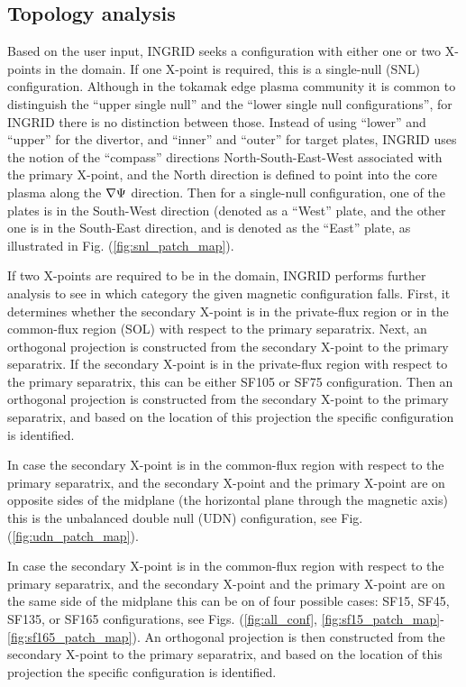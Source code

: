\subsection{Topology analysis}

Based on the user input, INGRID seeks a configuration with either one
or two X-points in the domain. If one X-point is required, this is a
single-null (SNL) configuration. Although in the tokamak edge plasma
community it is common to distinguish the ``upper single null'' and
the ``lower single null configurations'', for INGRID there is no
distinction between those. Instead of using ``lower'' and ``upper''
for the divertor, and ``inner'' and ``outer'' for target plates,
INGRID uses the notion of the ``compass'' directions
North-South-East-West associated with the primary X-point, and the
North direction is defined to point into the core plasma along the
$\nabla \Psi$ direction. Then for a single-null configuration, one of
the plates is in the South-West direction (denoted as a ``West''
plate, and the other one is in the South-East direction, and is
denoted as the ``East'' plate, as illustrated in Fig. (\ref{fig:snl_patch_map}).

If two X-points are required to be in the domain, INGRID performs
further analysis to see in which category the given magnetic
configuration falls. First, it determines whether the secondary
X-point is in the private-flux region or in the common-flux region
(SOL) with respect to the primary separatrix. Next, an orthogonal
projection is constructed from the secondary X-point to the primary
separatrix. If the secondary X-point is in the private-flux region
with respect to the primary separatrix, this can be either SF105 or
SF75 configuration.  Then an orthogonal projection is constructed from
the secondary X-point to the primary separatrix, and based on the
location of this projection the specific configuration is identified.

In case the secondary X-point is in the common-flux region with
respect to the primary separatrix, and the secondary X-point and the
primary X-point are on opposite sides of the midplane (the horizontal
plane through the magnetic axis) this is the unbalanced double null
(UDN) configuration, see Fig. (\ref{fig:udn_patch_map}).

In case the secondary X-point is in the common-flux region with
respect to the primary separatrix, and the secondary X-point and the
primary X-point are on the same side of the midplane this can be on of
four possible cases: SF15, SF45, SF135, or SF165 configurations, see
Figs. (\ref{fig:all_conf}, \ref{fig:sf15_patch_map}-\ref{fig:sf165_patch_map}). 
An orthogonal projection is then constructed from the
secondary X-point to the primary separatrix, and based on the location
of this projection the specific configuration is identified.
